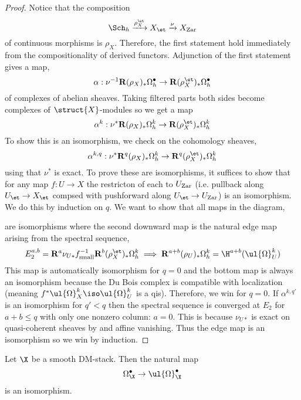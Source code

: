 \documentclass[12pt]{article}
\begin{document}
\begin{proof}
Notice that the composition
\[ \Sch_h \xrightarrow{\rho_X^{\et}} X_{\et} \xrightarrow{\nu} X_{\Zar} \]
of continuous morphisms is $\rho_X$. Therefore, the first statement hold immediately from the compositionality of derived functors. Adjunction of the first statement gives a map,
\[ \alpha : \nu^{-1} \R (\rho_X)_* \Omega^\bullet_h \to \R (\rho_{X}^\et)_* \Omega^\bullet_h   \]
of complexes of abelian sheaves. Taking filtered parts both sides become complexes of $\struct{X}$-modules so we get a map
\[ \alpha^k : \nu^* \R (\rho_X)_* \Omega^k_h \to \R (\rho_{X}^\et)_* \Omega^k_h \]
To show this is an isomorphism, we check on the cohomology sheaves,
\[ \alpha^{k,q} : \nu^* \R^q (\rho_X)_* \Omega^k_h \to \R^q (\rho_{X}^\et)_* \Omega^k_h \]
using that $\nu^*$ is exact. To prove these are isomorphisms, it suffices to show that for any \etale map $f : U \to X$ the restricton of each to $U_{\mathrm{Zar}}$ (i.e. pullback along $U_{\et} \to X_{\et}$ compsed with pushforward along $U_{\et} \to U_{\Zar}$) is an isomorphism. We do this by induction on $q$. We want to show that all maps in the diagram,
\begin{center}
\end{center}
are isomorphisms where the second downward map is the natural edge map arising from the spectral sequence,
\[ E_2^{a,b} = \R^a \nu_{U*} f_{\small}^{-1} \R^b (\rho_{X}^\et)_* \Omega^k_h \implies \R^{a+b} (\rho_U)_* \Omega^k_h = \H^{a+b}(\ul{\Omega}_U^k) \]
This map is automatically isomorphism for $q = 0$ and the bottom map is always an isomorphism because the Du Bois complex is compatible with \etale localization (meaning $f^* \ul{\Omega}_X^k \iso \ul{\Omega}_U^k$ is a qis). Therefore, we win for $q = 0$. If $\alpha^{k,q'}$ is an isomorphism for $q' < q$ then the spectral sequence is converged at $E_2$ for $a + b \le q$ with only one nonzero column: $a = 0$. This is because $\nu_{U*}$ is exact on quasi-coherent sheaves by  and affine vanishing. Thus the edge map is an isomorphism so we win by induction.
\end{proof}

\begin{prop}
Let $\X$ be a smooth DM-stack. Then the natural map
\[ \Omega_{\X}^\bullet \to \ul{\Omega}_{\X}^\bullet \]
is an isomorphism. 
\end{prop}
\end{document}
